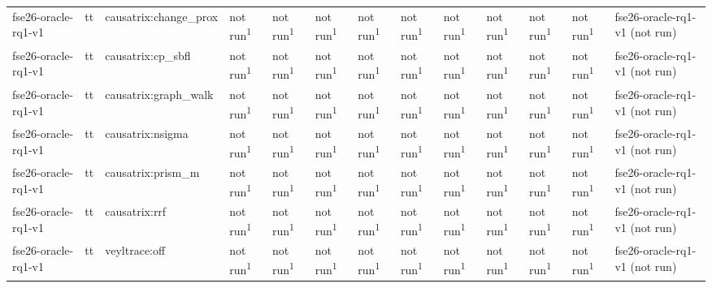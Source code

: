 \begin{table}[t]
\begin{tabular}{lllllllllllll}
fse26-oracle-rq1-v1 & tt & causatrix:change\_prox & not run\textsuperscript{1} & not run\textsuperscript{1} & not run\textsuperscript{1} & not run\textsuperscript{1} & not run\textsuperscript{1} & not run\textsuperscript{1} & not run\textsuperscript{1} & not run\textsuperscript{1} & not run\textsuperscript{1} & fse26-oracle-rq1-v1 (not run) \\
fse26-oracle-rq1-v1 & tt & causatrix:cp\_sbfl & not run\textsuperscript{1} & not run\textsuperscript{1} & not run\textsuperscript{1} & not run\textsuperscript{1} & not run\textsuperscript{1} & not run\textsuperscript{1} & not run\textsuperscript{1} & not run\textsuperscript{1} & not run\textsuperscript{1} & fse26-oracle-rq1-v1 (not run) \\
fse26-oracle-rq1-v1 & tt & causatrix:graph\_walk & not run\textsuperscript{1} & not run\textsuperscript{1} & not run\textsuperscript{1} & not run\textsuperscript{1} & not run\textsuperscript{1} & not run\textsuperscript{1} & not run\textsuperscript{1} & not run\textsuperscript{1} & not run\textsuperscript{1} & fse26-oracle-rq1-v1 (not run) \\
fse26-oracle-rq1-v1 & tt & causatrix:nsigma & not run\textsuperscript{1} & not run\textsuperscript{1} & not run\textsuperscript{1} & not run\textsuperscript{1} & not run\textsuperscript{1} & not run\textsuperscript{1} & not run\textsuperscript{1} & not run\textsuperscript{1} & not run\textsuperscript{1} & fse26-oracle-rq1-v1 (not run) \\
fse26-oracle-rq1-v1 & tt & causatrix:prism\_m & not run\textsuperscript{1} & not run\textsuperscript{1} & not run\textsuperscript{1} & not run\textsuperscript{1} & not run\textsuperscript{1} & not run\textsuperscript{1} & not run\textsuperscript{1} & not run\textsuperscript{1} & not run\textsuperscript{1} & fse26-oracle-rq1-v1 (not run) \\
fse26-oracle-rq1-v1 & tt & causatrix:rrf & not run\textsuperscript{1} & not run\textsuperscript{1} & not run\textsuperscript{1} & not run\textsuperscript{1} & not run\textsuperscript{1} & not run\textsuperscript{1} & not run\textsuperscript{1} & not run\textsuperscript{1} & not run\textsuperscript{1} & fse26-oracle-rq1-v1 (not run) \\
fse26-oracle-rq1-v1 & tt & veyltrace:off & not run\textsuperscript{1} & not run\textsuperscript{1} & not run\textsuperscript{1} & not run\textsuperscript{1} & not run\textsuperscript{1} & not run\textsuperscript{1} & not run\textsuperscript{1} & not run\textsuperscript{1} & not run\textsuperscript{1} & fse26-oracle-rq1-v1 (not run) \\

\end{tabular}
\end{table}
